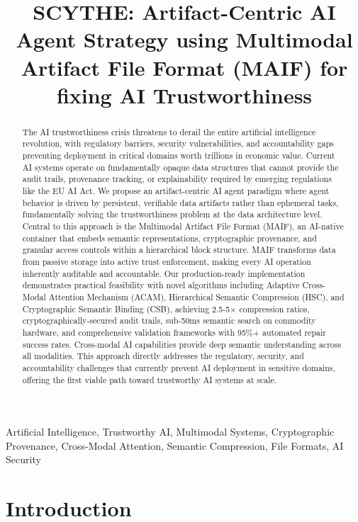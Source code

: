 \documentclass[conference]{IEEEtran}
\title{SCYTHE: Artifact-Centric AI Agent Strategy using Multimodal Artifact File Format (MAIF) for fixing AI Trustworthiness}
\author{
\IEEEauthorblockN{Anonymous Authors}
\IEEEauthorblockA{
Affiliation\\
Email: anonymous@example.com}
}
\begin{document}
\maketitle

\begin{abstract}
The AI trustworthiness crisis threatens to derail the entire artificial intelligence revolution, with regulatory barriers, security vulnerabilities, and accountability gaps preventing deployment in critical domains worth trillions in economic value. Current AI systems operate on fundamentally opaque data structures that cannot provide the audit trails, provenance tracking, or explainability required by emerging regulations like the EU AI Act. We propose an artifact-centric AI agent paradigm where agent behavior is driven by persistent, verifiable data artifacts rather than ephemeral tasks, fundamentally solving the trustworthiness problem at the data architecture level. Central to this approach is the Multimodal Artifact File Format (MAIF), an AI-native container that embeds semantic representations, cryptographic provenance, and granular access controls within a hierarchical block structure. MAIF transforms data from passive storage into active trust enforcement, making every AI operation inherently auditable and accountable. Our production-ready implementation demonstrates practical feasibility with novel algorithms including Adaptive Cross-Modal Attention Mechanism (ACAM), Hierarchical Semantic Compression (HSC), and Cryptographic Semantic Binding (CSB), achieving 2.5-5× compression ratios, cryptographically-secured audit trails, sub-50ms semantic search on commodity hardware, and comprehensive validation frameworks with 95\%+ automated repair success rates. Cross-modal AI capabilities provide deep semantic understanding across all modalities. This approach directly addresses the regulatory, security, and accountability challenges that currently prevent AI deployment in sensitive domains, offering the first viable path toward trustworthy AI systems at scale.
\end{abstract}

\begin{IEEEkeywords}
Artificial Intelligence, Trustworthy AI, Multimodal Systems, Cryptographic Provenance, Cross-Modal Attention, Semantic Compression, File Formats, AI Security
\end{IEEEkeywords}

\section{Introduction}
\end{document}
